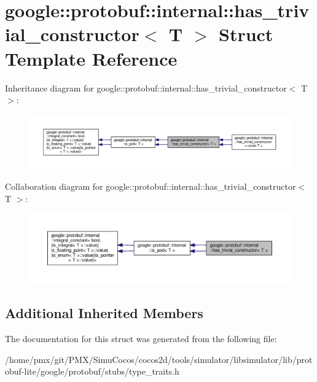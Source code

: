 \hypertarget{structgoogle_1_1protobuf_1_1internal_1_1has__trivial__constructor}{}\section{google\+:\+:protobuf\+:\+:internal\+:\+:has\+\_\+trivial\+\_\+constructor$<$ T $>$ Struct Template Reference}
\label{structgoogle_1_1protobuf_1_1internal_1_1has__trivial__constructor}


Inheritance diagram for google\+:\+:protobuf\+:\+:internal\+:\+:has\+\_\+trivial\+\_\+constructor$<$ T $>$\+:
\nopagebreak
\begin{figure}[H]
\begin{center}
\leavevmode
\includegraphics[width=350pt]{structgoogle_1_1protobuf_1_1internal_1_1has__trivial__constructor__inherit__graph}
\end{center}
\end{figure}


Collaboration diagram for google\+:\+:protobuf\+:\+:internal\+:\+:has\+\_\+trivial\+\_\+constructor$<$ T $>$\+:
\nopagebreak
\begin{figure}[H]
\begin{center}
\leavevmode
\includegraphics[width=350pt]{structgoogle_1_1protobuf_1_1internal_1_1has__trivial__constructor__coll__graph}
\end{center}
\end{figure}
\subsection*{Additional Inherited Members}


The documentation for this struct was generated from the following file\+:\begin{DoxyCompactItemize}
\item 
/home/pmx/git/\+P\+M\+X/\+Simu\+Cocos/cocos2d/tools/simulator/libsimulator/lib/protobuf-\/lite/google/protobuf/stubs/type\+\_\+traits.\+h\end{DoxyCompactItemize}
